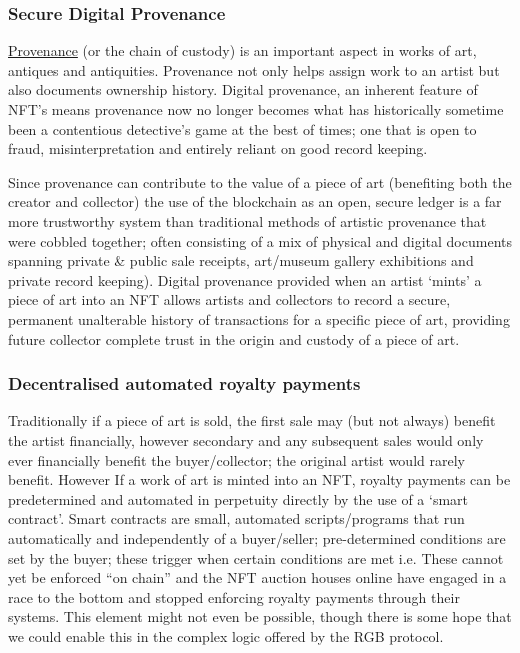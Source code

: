 \subsubsection{Secure Digital Provenance}
\href{https://en.wikipedia.org/wiki/Provenance}{Provenance} (or the chain of custody) is an important aspect in works of art, antiques and antiquities. Provenance not only helps assign work to an artist but also documents ownership history. Digital provenance, an inherent feature of NFT's means provenance now no longer becomes what has historically sometime been a contentious detective's game at the best of times; one that is open to fraud, misinterpretation and entirely reliant on good record keeping.\par
Since provenance can contribute to the value of a piece of art (benefiting both the creator and collector) the use of the blockchain as an open, secure ledger is a far more trustworthy system than traditional methods of artistic provenance that were cobbled together; often
consisting of a mix of physical and digital documents spanning private
\& public sale receipts, art/museum gallery exhibitions and private
record keeping). Digital provenance provided when an artist `mints' a
piece of art into an NFT allows artists and collectors to record a
secure, permanent unalterable history of transactions for a specific
piece of art, providing future collector complete trust in the origin
and custody of a piece of art.
\subsubsection{Decentralised automated royalty payments} 
Traditionally if a  piece of art is sold, the first sale may (but not always) benefit the
  artist financially, however secondary and any subsequent sales would
  only ever financially benefit the buyer/collector; the original artist
  would rarely benefit. However If a work of art is minted into an NFT,
  royalty payments can be predetermined and automated in perpetuity
  directly by the use of a `smart contract'. Smart contracts are small,
  automated scripts/programs that run automatically and independently of
  a buyer/seller; pre-determined conditions are set by the buyer; these
  trigger when certain conditions are met i.e. These cannot yet be enforced ``on chain'' and the NFT auction houses online have engaged in a race to the bottom and stopped enforcing royalty payments through their systems. This element might not even be possible, though there is some hope that we could enable this in the complex logic offered by the RGB protocol.
